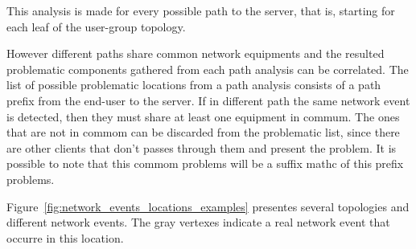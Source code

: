 This analysis is made for every possible path to the server, that is, starting
for each leaf of the user-group topology.

However different paths share common network equipments and the resulted
problematic components gathered from each path analysis can be correlated. The
list of possible problematic locations from a path analysis consists of a path
prefix from the end-user to the server. If in different path the same network
event is detected, then they must share at least one equipment in commum. The
ones that are not in commom can be discarded from the problematic list, since
there are other clients that don't passes through them and present the problem.
It is possible to note that this commom problems will be a suffix mathc of this
prefix problems.

Figure~\ref{fig:network_events_locations_examples} presentes several topologies
and different network events. The gray vertexes indicate a real network event
that occurre in this location.

